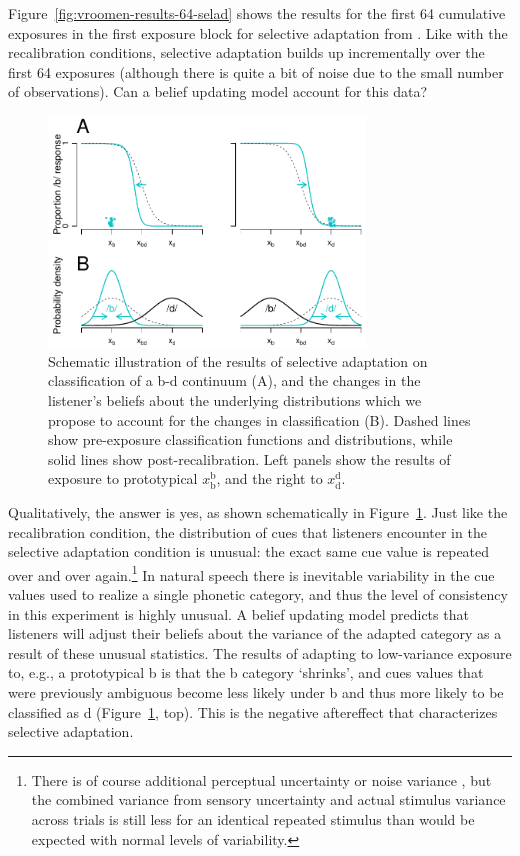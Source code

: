 Figure~\ref{fig:vroomen-results-64-selad} shows the results for the first 64 cumulative exposures in the first exposure block for selective adaptation from .  Like with the recalibration conditions, selective adaptation builds up incrementally over the first 64 exposures (although there is quite a bit of noise due to the small number of observations).  Can a belief updating model account for this data?

\begin{figure}[htb]
  \centering
  \includegraphics[width=0.75\textwidth]{figs/belief-updating-selad-schematic.pdf}
  \caption{Schematic illustration of the results of selective adaptation on classification of a \ph b-\ph d continuum (A), and the changes in the listener's beliefs about the underlying distributions which we propose to account for the changes in classification (B).  Dashed lines show pre-exposure classification functions and distributions, while solid lines show post-recalibration.  Left panels show the results of exposure to prototypical $x_\mathrm{b}^\mathrm{b}$, and the right to $x_\mathrm{d}^\mathrm{d}$.}
  \label{fig:belief-updating-selad-schematic}
\end{figure}


Qualitatively, the answer is yes, as shown schematically in Figure~\ref{fig:belief-updating-selad-schematic}.  Just like the recalibration condition, the distribution of cues that listeners encounter in the selective adaptation condition is unusual: the exact same cue value is repeated over and over again.\footnote{There is of course additional perceptual uncertainty or noise variance \cite{Feldman2009a}, but the combined variance from sensory uncertainty and actual stimulus variance across trials is still less for an identical repeated stimulus than would be expected with normal levels of variability.}  In natural speech there is inevitable variability in the cue values used to realize a single phonetic category, and thus the level of consistency in this experiment is highly unusual.  A belief updating model predicts that listeners will adjust their beliefs about the variance of the adapted category as a result of these unusual statistics.  The results of adapting to low-variance exposure to, e.g., a prototypical \ph b is that the \ph b category `shrinks', and cues values that were previously ambiguous become less likely under \ph b and thus more likely to be classified as \ph d (Figure~\ref{fig:belief-updating-selad-schematic}, top).  This is the negative aftereffect that characterizes selective adaptation.

